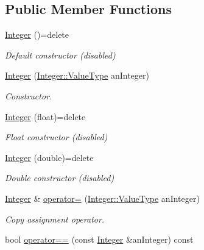 \subsection*{Public Member Functions}
\begin{DoxyCompactItemize}
\item 
\mbox{\hyperlink{classlibrary_1_1core_1_1types_1_1_integer_a6483b1c4e13e5ed6af5e7a58347efead}{Integer}} ()=delete
\begin{DoxyCompactList}\small\item\em Default constructor (disabled) \end{DoxyCompactList}\item 
\mbox{\hyperlink{classlibrary_1_1core_1_1types_1_1_integer_ac282b8e24c1d1a43e578c5be3c70ea27}{Integer}} (\mbox{\hyperlink{classlibrary_1_1core_1_1types_1_1_integer_a623afb1580f870fd8a1997b1c12c917d}{Integer\+::\+Value\+Type}} an\+Integer)
\begin{DoxyCompactList}\small\item\em Constructor. \end{DoxyCompactList}\item 
\mbox{\hyperlink{classlibrary_1_1core_1_1types_1_1_integer_af3bcebe374c4b7b4329ed0a7fae04abd}{Integer}} (float)=delete
\begin{DoxyCompactList}\small\item\em Float constructor (disabled) \end{DoxyCompactList}\item 
\mbox{\hyperlink{classlibrary_1_1core_1_1types_1_1_integer_ab0d94d5cfc78f38f1598679015f4ab61}{Integer}} (double)=delete
\begin{DoxyCompactList}\small\item\em Double constructor (disabled) \end{DoxyCompactList}\item 
\mbox{\hyperlink{classlibrary_1_1core_1_1types_1_1_integer}{Integer}} \& \mbox{\hyperlink{classlibrary_1_1core_1_1types_1_1_integer_ab77cae94a9e6d4a405a555dd55763ea2}{operator=}} (\mbox{\hyperlink{classlibrary_1_1core_1_1types_1_1_integer_a623afb1580f870fd8a1997b1c12c917d}{Integer\+::\+Value\+Type}} an\+Integer)
\begin{DoxyCompactList}\small\item\em Copy assignment operator. \end{DoxyCompactList}\item 
bool \mbox{\hyperlink{classlibrary_1_1core_1_1types_1_1_integer_a52b3a012d6c6779773d051800daac516}{operator==}} (const \mbox{\hyperlink{classlibrary_1_1core_1_1types_1_1_integer}{Integer}} \&an\+Integer) const

\end{DoxyCompactItemize}
